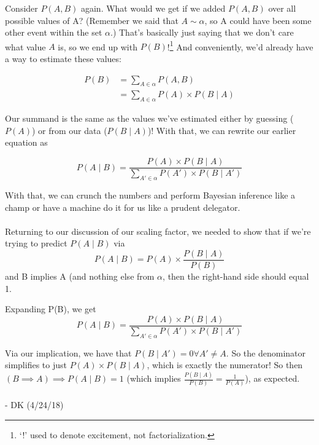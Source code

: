 \documentclass[letterpaper,12pt]{report}
\begin{document}
Consider \(P(A,B)\) again. What would we get if we added \(P(A,B)\) over
all possible values of A? (Remember we said that \(A \sim \alpha\), so A
could have been some other event within the set \(\alpha\).) That's
basically just saying that we don't care what value \(A\) is, so we end
up with \(P(B)\)!\footnote{
  `!' used to denote excitement, not factorialization.
  }
And conveniently, we'd already have a way to estimate these values:

\[\begin{split} P(B) &= \sum_{A \in \alpha} P(A,B) \\
                     &= \sum_{A \in \alpha} P(A) \times P(B \mid A)          \end{split}\]

Our summand is the same as the values we've estimated either by guessing
(\(P(A)\)) or from our data (\(P(B \mid A)\))! With that, we can rewrite
our earlier equation as

\[ P(A \mid B) = 
  \frac{P(A) \times P(B \mid A)} {\sum_{A' \in \alpha} P(A') \times P(B \mid A')} \]

With that, we can crunch the numbers and perform Bayesian inference like
a champ or have a machine do it for us like a prudent delegator.
\\
\\
Returning to our discussion of our scaling factor, we needed to show that if
we're trying to predict \(P(A \mid B)\) via
\[P(A \mid B) = P(A) \times \frac {P(B \mid A)} {P(B)} \]
and B implies A (and nothing else from \(\alpha\), then the right-hand side should equal 1.

Expanding P(B), we get
\[ P(A \mid B) = 
  \frac{P(A) \times P(B \mid A)} {\sum_{A' \in \alpha} P(A') \times P(B \mid A')} \]

Via our implication, we have that \(P(B \mid A') = 0 \forall A' \neq A\).
So the denominator simplifies to just \(P(A) \times P(B \mid A)\), which is exactly the
numerator! So then \(\left(B \implies A\right) \implies P(A \mid B) = 1\) (which implies
\( \frac {P(B \mid A)} {P(B)} = \frac {1} {P(A)} \)), as expected.
\\
\\
- DK (4/24/18)
\end{document}
